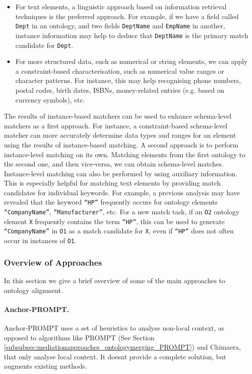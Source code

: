 \documentclass{fast_latex}
\begin{document}
\begin{itemize}
\item For text elements, a linguistic approach based on information
retrieval techniques is the preferred approach. For example, if we have
a field called \texttt{Dept} in an ontology, and two
fields \texttt{DeptName} and \texttt{EmpName}
in another, instance information may help to deduce that
\texttt{DeptName} is the primary match candidate for
\texttt{Dept}. 
\item For more structured data, such as numerical or string elements, we
can apply a constraint-based characterisation, such as numerical value
ranges or character patterns. For instance, this may help recognising
phone numbers, postal codes, birth dates, ISBNs, money-related entries
(e.g. based on currency symbols), etc. 
\end{itemize}
The results of instance-based matchers can be used to enhance
schema-level matchers as a first approach. For instance, a
constraint-based schema-level matcher can more accurately determine
data types and ranges for an element using the results of
instance-based matching. A second approach is to perform instance-level
matching on its own. Matching elements from the first ontology to the
second one, and then vice-versa, we can obtain schema-level matches.
Instance-level matching can also be performed by using auxiliary
information. This is especially helpful for matching text elements by
providing match candidates for individual keywords. For example, a
previous analysis may have revealed that the keyword
\texttt{{\textquotedblleft}HP{\textquotedblright}}
frequently occurs for ontology elements
\texttt{{\textquotedblleft}CompanyName{\textquotedblright}},
\texttt{{\textquotedblleft}Manufacturer{\textquotedblright}},
etc. For a new match task, if an \texttt{O2} ontology
element \texttt{X} frequently contains the term
\texttt{{\textquotedblleft}HP{\textquotedblright}}, this
can be used to generate
\texttt{{\textquotedblleft}CompanyName{\textquotedblright}}
in \texttt{O1} as a match candidate for
\texttt{X}, even if
\texttt{{\textquotedblleft}HP{\textquotedblright}} does
not often occur in instances of \texttt{O1}. 

\subsubsection{Overview of Approaches}
In this section we give a brief overview of some of the main approaches
to ontology alignment. 

\paragraph{Anchor-PROMPT.}
Anchor-PROMPT \cite{noy2000anchor_prompt} uses a set of heuristics to analyse
non-local context, as opposed to algorithms like PROMPT \cite{noy2000prompt} 
(See Section \ref{subsubsec:mediationapproaches_ontologymerging_PROMPT}) and Chimaera, that only analyse local context.
It doesn{\textquotesingle}t provide a complete solution, but augments
existing methods. 
\end{document}
